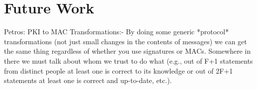 \section{Future Work}
\be
\item Petros: PKI to MAC Transformations:- By doing some
generic *protocol* transformations (not just small changes in the
contents of messages) we can get the same thing regardless of whether
you use signatures or MACs. Somewhere in there we must talk about whom
we trust to do what (e.g., out of F+1 statements from distinct people at
least one is correct to its knowledge or out of 2F+1 statements at least
one is correct and up-to-date, etc.).
\ee
